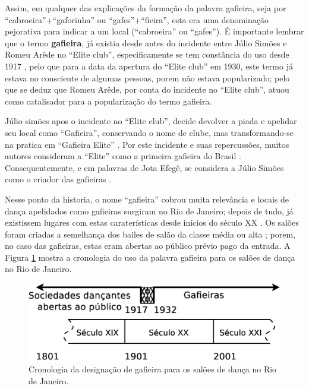 Assim, em qualquer das explicações da formação da palavra gafieira,
seja por ``cabroeira''+``gaforinha'' ou ``gafes''+``fieira'',
esta era uma denominação pejorativa para indicar a um local (``cabroeira'' ou ``gafes'').
É importante lembrar que o termo \textbf{gafieira}, já existia desde antes do 
incidente entre Júlio Simões e Romeu Arêde no ``Elite club'', 
especificamente se tem constância do uso desde 1917 \cite[pp. 4]{oldgafieira1},
pelo que para a data da apertura do ``Elite club'' em 1930,
este termo já estava no consciente de algumas pessoas, porem não estava popularizado;
pelo que se deduz que Romeu Arêde, por conta do incidente no ``Elite club'', 
atuou como catalisador para a popularização do termo gafieira.

Júlio simões apos o incidente no ``Elite club'', 
decide devolver a piada e apelidar seu local como 
``Gafieira'', conservando o nome de clube, 
mas transformando-se na pratica em ``Gafieira Elite'' \cite[pp. 79]{moura1995tia} \cite[pp. 6 - Tribuna Bis]{gafieiraaredeout3}.
Por este incidente e suas repercussões, 
muitos autores consideram a ``Elite'' como a primeira gafieira do Brasil \cite{cabral2016elisete} \cite[pp. 84]{cabral1996escolas}.
Consequentemente, e em palavras de Jota Efegê, 
se considera a Júlio Simões como o criador das gafieiras \cite[pp. 3 - cad. 3]{juliosimoes}.

Nesse ponto da historia, 
o nome ``gafieira'' cobrou muita relevância e locais de dança apelidados como gafieiras surgiram no Rio de Janeiro;
depois de tudo, já existissem lugares com estas caraterísticas desde inícios do século XX \cite[pp. 49]{diniz2003almanaque}.
Os salões foram criadas a semelhança dos bailes de salão da classe média ou alta \cite[pp. 78]{coutinho2006cronistas}; 
porem, no caso das gafieiras, estas eram abertas ao público prévio pago da entrada.
A Figura \ref{fig:gafieiracrono} mostra a cronologia do uso da palavra gafieira para os salões de dança no Rio de Janeiro.
\begin{figure}[h]
  \centering
    \includegraphics[width=1.0\textwidth]{chapters/cap-historia-gafieiras/gafieira-crono.eps}
  \caption{Cronologia da designação de gafieira para os salões de dança no Rio de Janeiro.}
  \label{fig:gafieiracrono}
\end{figure}

